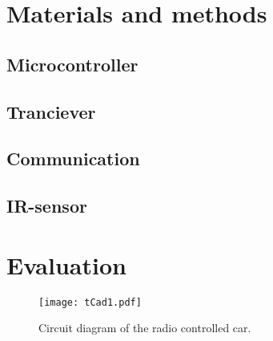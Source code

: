 \documentclass[a4paper,twoside,titlepage]{article}
\begin{document}
\section{Materials and methods} %
\label{sec:materials_and_methods}

\subsection{Microcontroller} %
\label{sub:microcontroller}

\subsection{Tranciever} %
\label{sub:tranciever}

\subsection{Communication} %
\label{sub:communication}

\subsection{IR-sensor} %
\label{sub:ir_sensor}

\section{Evaluation} %
\label{sec:evaluation}

\begin{figure}[hp]
   \caption{Circuit diagram of the radio controlled car.}
   \label{fig:circuit}
   \vspace{15mm}
   \centering
      \texttt{[image: tCad1.pdf]}
\end{figure}

\end{document}
